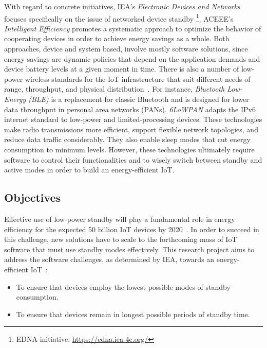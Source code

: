 \documentclass[12pt,english]{amsart}
\begin{document}
With regard to concrete initiatives, IEA's \emph{Electronic Devices and Networks}
focuses specifically on the issue of networked device standby%
\footnote{EDNA initiative: \url{https://edna.iea-4e.org/}}.
ACEEE's \emph{Intelligent Efficiency} promotes a systematic approach
to optimize the behavior of cooperating devices in order to achieve energy
savings as a whole.
Both approaches, device and system based, involve mostly software solutions,
since energy savings are dynamic policies that depend on the application
demands and device battery levels at a given moment in time.
%
There is also a number of low-power wireless standards for the IoT
infrastructure that suit different needs of range, throughput, and physical
distribution~\cite{iot.energy.2}.
For instance, \emph{Bluetooth Low-Energy (BLE)} is a replacement for classic
Bluetooth and is designed for lower data throughput in personal area
networks (PANs).
\emph{6LoWPAN} adapts the IPv6 internet standard to low-power and
limited-processing devices.
%
These technologies make radio transmissions more efficient,
support flexible network topologies, and reduce data traffic considerably.
They also enable sleep modes that cut energy consumption to minimum levels.
%
However, these technologies ultimately require software to control their
functionalities and to wisely switch between standby and active modes in order
to build an energy-efficient IoT.

\subsection{Objectives}
\label{sec.goals}

%

Effective use of low-power standby will play a fundamental role in energy
efficiency for the expected 50 billion IoT devices by 2020~\cite{iea.data}.
In order to succeed in this challenge, new solutions have to scale to the
forthcoming mass of IoT software that must use standby modes effectively.
%
This research project aims to address the software challenges, as determined by
IEA, towards an energy-efficient IoT~\cite{iea.data}:
%
\begin{itemize}
    \item To ensure that devices employ the lowest possible modes of standby consumption.
    \item To ensure that devices remain in longest possible periods of standby time.
\end{itemize}
\end{document}
